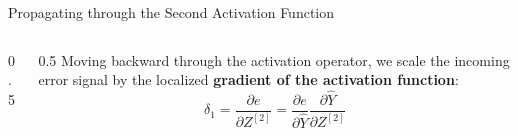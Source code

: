 \begin{frame}{Propagating through the Second Activation Function}
\begin{columns}
\begin{column}{0.5\textwidth}
\begin{center}
{
				}
			\end{center}
		\end{column}
		\begin{column}{0.5\textwidth}
			Moving backward through the activation operator, we scale the incoming error signal by the localized \textbf{\textcolor{lime!80!black}{gradient of the activation function}}:
			\begin{equation*}
				\delta_1 = \frac{\partial{e}}{\partial{Z^{[2]}}} = \frac{\partial{e}}{\partial{\hat{Y}}} \frac{\partial{\hat{Y}}}{\partial{Z^{[2]}}}
			\end{equation*}
		\end{column}
	\end{columns}
\end{frame}

